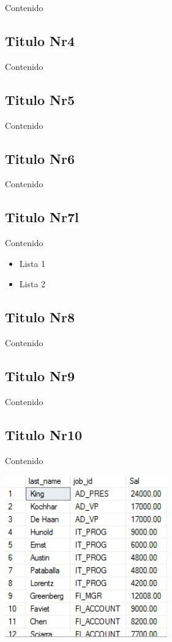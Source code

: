 \documentclass[twoside,twocolumn]{article}
\begin{document}
Contenido
 
\subsection{Titulo Nr4}

Contenido

\subsection{Titulo Nr5}

Contenido

\subsection{Titulo Nr6}
Contenido

\subsection{Titulo Nr7l}
Contenido

\begin{itemize}	

	\item Lista 1
	\item Lista 2

\end{itemize} 



\subsection{Titulo Nr8}
Contenido 


\subsection{Titulo Nr9}
Contenido 



\subsection{Titulo Nr10}
Contenido 

\begin{center}
	\includegraphics[width=7cm]{./Imagenes/img} 
\end{center}
\end{document}
